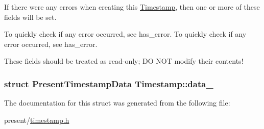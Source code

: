 If there were any errors when creating this \hyperlink{structTimestamp}{Timestamp}, then one or more of these fields will be set. 

To quickly check if any error occurred, see {\ttfamily has\-\_\-error}. To quickly check if any error occurred, see {\ttfamily has\-\_\-error}.

These fields should be treated as read-\/only; D\-O N\-O\-T modify their contents! \hypertarget{structTimestamp_adf3177050edc50aa8b6e768922e4cf56}{
\subsubsection[{data\-\_\-}]{\setlength{\rightskip}{0pt plus 5cm}struct Present\-Timestamp\-Data Timestamp\-::data\-\_\-}}\label{structTimestamp_adf3177050edc50aa8b6e768922e4cf56}


The documentation for this struct was generated from the following file\-:\begin{DoxyCompactItemize}
\item 
present/\hyperlink{timestamp_8h}{timestamp.\-h}\end{DoxyCompactItemize}
